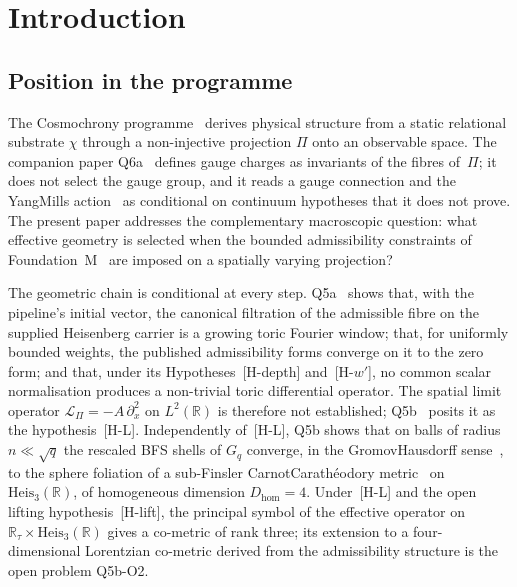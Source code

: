 \documentclass[11pt,a4paper]{article}
\begin{document}
    \clearpage
    \tableofcontents

    \clearpage

  \section{Introduction}
  \label{sec:intro}

  \subsection*{Position in the programme}

    The Cosmochrony programme~\cite{Cosmochrony} derives physical structure from a static relational substrate
    $\chi$ through a non-injective projection $\Pi$ onto an observable space.
    The companion paper Q6a~\cite{Beau2026q6a} defines gauge charges as invariants of the fibres of~$\Pi$; it does
    not select the gauge group, and it reads a gauge connection and the
    Yang\textendash Mills action~\cite{YangMills1954} as conditional on continuum hypotheses that it does not
    prove.
    The present paper addresses the complementary macroscopic question: what effective geometry is selected when the
    bounded admissibility constraints of Foundation~M~\cite{Beau2026m} are imposed on a spatially varying
    projection?

    The geometric chain is conditional at every step.
    Q5a~\cite{Beau2026q5a} shows that, with the pipeline's initial vector, the canonical filtration of the admissible
    fibre on the supplied Heisenberg carrier is a growing toric Fourier window; that, for uniformly bounded weights,
    the published admissibility forms converge on it to the zero form; and that, under its Hypotheses~[H-depth]
    and~[H-$w'$], no common scalar normalisation produces a non-trivial toric differential operator.
    The spatial limit operator $\mathcal{L}_\Pi = -A\,\partial_x^2$ on $L^2(\mathbb{R})$ is therefore not established;
    Q5b~\cite{Beau2026q5b} posits it as the hypothesis~[H-L].
    Independently of~[H-L], Q5b shows that on balls of radius $n \ll \sqrt{q}$ the rescaled BFS shells of $G_q$
    converge, in the Gromov\textendash Hausdorff sense~\cite{Gromov1981}, to the sphere foliation of a sub-Finsler
    Carnot\textendash Carath\'eodory metric~\cite{Montgomery2002} on $\mathrm{Heis}_3(\mathbb{R})$, of homogeneous
    dimension $D_{\mathrm{hom}} = 4$.
    Under~[H-L] and the open lifting hypothesis~[H-lift], the principal symbol of the effective operator on
    $\mathbb{R}_\tau \times \mathrm{Heis}_3(\mathbb{R})$ gives a co-metric of rank three; its extension to a
    four-dimensional Lorentzian co-metric derived from the admissibility structure is the open problem Q5b-O2.
\end{document}
